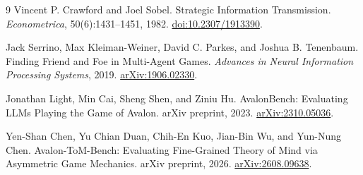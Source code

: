 \documentclass[11pt,letterpaper]{article}
\begin{document}
\begin{thebibliography}{9}
Vincent P. Crawford and Joel Sobel.
\newblock Strategic Information Transmission.
\newblock \emph{Econometrica}, 50(6):1431--1451, 1982.
\newblock \href{https://doi.org/10.2307/1913390}{doi:10.2307/1913390}.

Jack Serrino, Max Kleiman-Weiner, David C. Parkes, and Joshua B. Tenenbaum.
\newblock Finding Friend and Foe in Multi-Agent Games.
\newblock \emph{Advances in Neural Information Processing Systems}, 2019.
\newblock \href{https://arxiv.org/abs/1906.02330}{arXiv:1906.02330}.

Jonathan Light, Min Cai, Sheng Shen, and Ziniu Hu.
\newblock AvalonBench: Evaluating LLMs Playing the Game of Avalon.
\newblock arXiv preprint, 2023.
\newblock \href{https://arxiv.org/abs/2310.05036}{arXiv:2310.05036}.

Yen-Shan Chen, Yu Chian Duan, Chih-En Kuo, Jian-Bin Wu, and Yun-Nung Chen.
\newblock Avalon-ToM-Bench: Evaluating Fine-Grained Theory of Mind via Asymmetric Game Mechanics.
\newblock arXiv preprint, 2026.
\newblock \href{https://arxiv.org/abs/2608.09638}{arXiv:2608.09638}.
\end{thebibliography}
\end{document}
